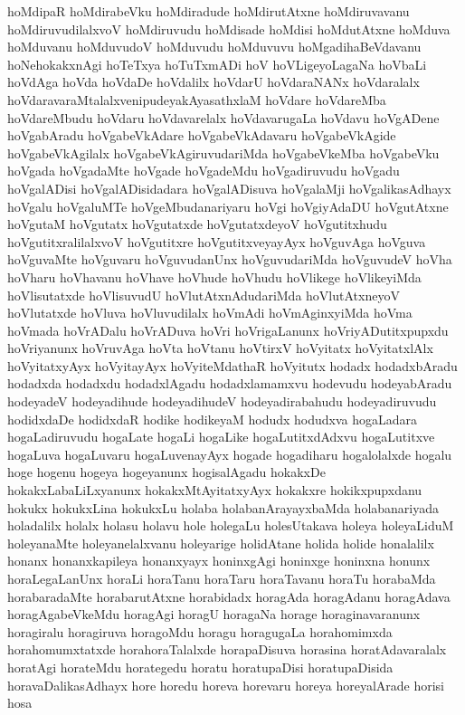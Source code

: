 {hoMdipaR
hoMdirabeVku
hoMdiradude
hoMdirutAtxne
hoMdiruvavanu
hoMdiruvudilalxvoV
hoMdiruvudu
hoMdisade
hoMdisi
hoMdutAtxne
hoMduva
hoMduvanu
hoMduvudoV
hoMduvudu
hoMduvuvu
hoMgadihaBeVdavanu
hoNehokakxnAgi
hoTeTxya
hoTuTxmADi
hoV
hoVLigeyoLagaNa
hoVbaLi
hoVdAga
hoVda
hoVdaDe
hoVdalilx
hoVdarU
hoVdaraNANx
hoVdaralalx
hoVdaravaraMtalalxvenipudeyakAyasathxlaM
hoVdare
hoVdareMba
hoVdareMbudu
hoVdaru
hoVdavarelalx
hoVdavarugaLa
hoVdavu
hoVgADene
hoVgabAradu
hoVgabeVkAdare
hoVgabeVkAdavaru
hoVgabeVkAgide
hoVgabeVkAgilalx
hoVgabeVkAgiruvudariMda
hoVgabeVkeMba
hoVgabeVku
hoVgada
hoVgadaMte
hoVgade
hoVgadeMdu
hoVgadiruvudu
hoVgadu
hoVgalADisi
hoVgalADisidadara
hoVgalADisuva
hoVgalaMji
hoVgalikasAdhayx
hoVgalu
hoVgaluMTe
hoVgeMbudanariyaru
hoVgi
hoVgiyAdaDU
hoVgutAtxne
hoVgutaM
hoVgutatx
hoVgutatxde
hoVgutatxdeyoV
hoVgutitxhudu
hoVgutitxralilalxvoV
hoVgutitxre
hoVgutitxveyayAyx
hoVguvAga
hoVguva
hoVguvaMte
hoVguvaru
hoVguvudanUnx
hoVguvudariMda
hoVguvudeV
hoVha
hoVharu
hoVhavanu
hoVhave
hoVhude
hoVhudu
hoVlikege
hoVlikeyiMda
hoVlisutatxde
hoVlisuvudU
hoVlutAtxnAdudariMda
hoVlutAtxneyoV
hoVlutatxde
hoVluva
hoVluvudilalx
hoVmAdi
hoVmAginxyiMda
hoVma
hoVmada
hoVrADalu
hoVrADuva
hoVri
hoVrigaLanunx
hoVriyADutitxpupxdu
hoVriyanunx
hoVruvAga
hoVta
hoVtanu
hoVtirxV
hoVyitatx
hoVyitatxlAlx
hoVyitatxyAyx
hoVyitayAyx
hoVyiteMdathaR
hoVyitutx
hodadx
hodadxbAradu
hodadxda
hodadxdu
hodadxlAgadu
hodadxlamamxvu
hodevudu
hodeyabAradu
hodeyadeV
hodeyadihude
hodeyadihudeV
hodeyadirabahudu
hodeyadiruvudu
hodidxdaDe
hodidxdaR
hodike
hodikeyaM
hodudx
hodudxva
hogaLadara
hogaLadiruvudu
hogaLate
hogaLi
hogaLike
hogaLutitxdAdxvu
hogaLutitxve
hogaLuva
hogaLuvaru
hogaLuvenayAyx
hogade
hogadiharu
hogalolalxde
hogalu
hoge
hogenu
hogeya
hogeyanunx
hogisalAgadu
hokakxDe
hokakxLabaLiLxyanunx
hokakxMtAyitatxyAyx
hokakxre
hokikxpupxdanu
hokukx
hokukxLina
hokukxLu
holaba
holabanArayayxbaMda
holabanariyada
holadalilx
holalx
holasu
holavu
hole
holegaLu
holesUtakava
holeya
holeyaLiduM
holeyanaMte
holeyanelalxvanu
holeyarige
holidAtane
holida
holide
honalalilx
honanx
honanxkapileya
honanxyayx
honinxgAgi
honinxge
honinxna
honunx
horaLegaLanUnx
horaLi
horaTanu
horaTaru
horaTavanu
horaTu
horabaMda
horabaradaMte
horabarutAtxne
horabidadx
horagAda
horagAdanu
horagAdava
horagAgabeVkeMdu
horagAgi
horagU
horagaNa
horage
horaginavaranunx
horagiralu
horagiruva
horagoMdu
horagu
horagugaLa
horahomimxda
horahomumxtatxde
horahoraTalalxde
horapaDisuva
horasina
horatAdavaralalx
horatAgi
horateMdu
horategedu
horatu
horatupaDisi
horatupaDisida
horavaDalikasAdhayx
hore
horedu
horeva
horevaru
horeya
horeyalArade
horisi
hosa
}
